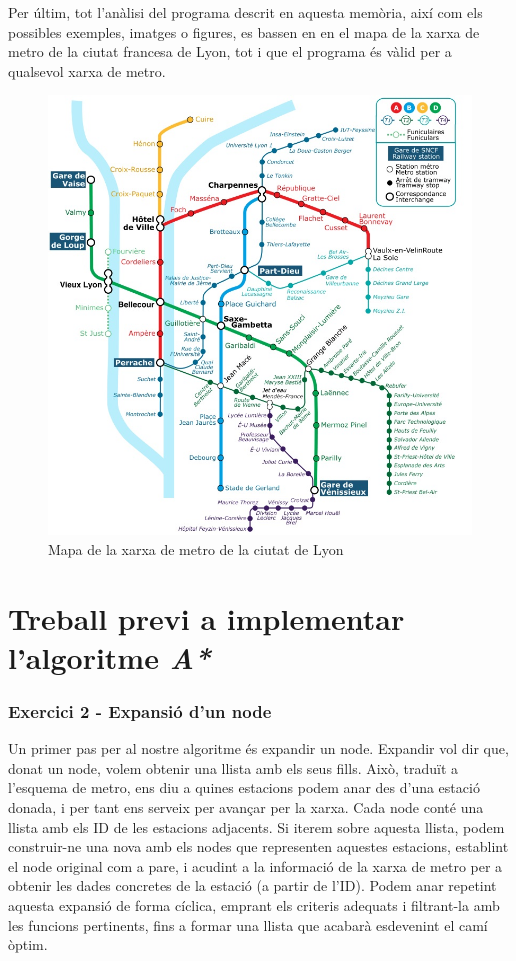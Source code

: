 \documentclass[a4paper,12pt,hidelinks]{article}
\begin{document}
        Per últim, tot l’anàlisi del programa descrit en aquesta memòria, així com els possibles exemples, imatges o figures, es bassen en en el mapa de la xarxa de metro de la ciutat francesa de Lyon, tot i que el programa és vàlid per a qualsevol xarxa de metro.
        \begin{figure}[hb]
            \centering    
            \includegraphics[scale=0.5]{Lyon.jpg}
            \caption{Mapa de la xarxa de metro de la ciutat de Lyon}
        \end{figure}

    \pagebreak

    \part{Treball previ a implementar l'algoritme \textit{A*}}
    \label{part:previ}

        \section{Exercici 2 - Expansió d’un node}
        \label{sec:Exercici2}

            Un primer pas per al nostre algoritme és expandir un node. Expandir vol dir que, donat un node, volem obtenir una llista amb els seus fills. Això, traduït a l’esquema de metro, ens diu a quines estacions podem anar des d’una estació donada, i per tant ens serveix per avançar per la xarxa.
            Cada node conté una llista amb els ID de les estacions adjacents. Si iterem sobre aquesta llista, podem construir-ne una nova amb els nodes que representen aquestes estacions, establint el node original com a pare, i acudint a la informació de la xarxa de metro per a obtenir les dades concretes de la estació (a partir de l’ID).
            Podem anar repetint aquesta expansió de forma cíclica, emprant els criteris adequats i filtrant-la amb les funcions pertinents, fins a formar una llista que acabarà esdevenint el camí òptim.
\end{document}
